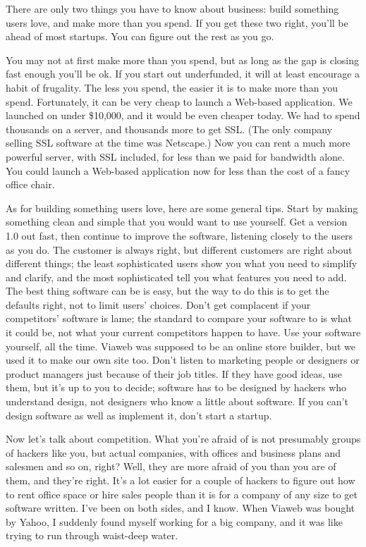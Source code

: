 There are only two things you have to know about business: build
something users love, and make more than you spend. If you get these two
right, you'll be ahead of most startups. You can figure out the rest as
you go.

You may not at first make more than you spend, but as long as the gap is
closing fast enough you'll be ok. If you start out underfunded, it will
at least encourage a habit of frugality. The less you spend, the easier
it is to make more than you spend. Fortunately, it can be very cheap to
launch a Web-based application. We launched on under \$10,000, and it
would be even cheaper today. We had to spend thousands on a server, and
thousands more to get SSL. (The only company selling SSL software at the
time was Netscape.) Now you can rent a much more powerful server, with
SSL included, for less than we paid for bandwidth alone. You could
launch a Web-based application now for less than the cost of a fancy
office chair.

As for building something users love, here are some general tips. Start
by making something clean and simple that you would want to use
yourself. Get a version 1.0 out fast, then continue to improve the
software, listening closely to the users as you do. The customer is
always right, but different customers are right about different things;
the least sophisticated users show you what you need to simplify and
clarify, and the most sophisticated tell you what features you need to
add. The best thing software can be is easy, but the way to do this is
to get the defaults right, not to limit users' choices. Don't get
complacent if your competitors' software is lame; the standard to
compare your software to is what it could be, not what your current
competitors happen to have. Use your software yourself, all the time.
Viaweb was supposed to be an online store builder, but we used it to
make our own site too. Don't listen to marketing people or designers or
product managers just because of their job titles. If they have good
ideas, use them, but it's up to you to decide; software has to be
designed by hackers who understand design, not designers who know a
little about software. If you can't design software as well as implement
it, don't start a startup.

Now let's talk about competition. What you're afraid of is not
presumably groups of hackers like you, but actual companies, with
offices and business plans and salesmen and so on, right? Well, they are
more afraid of you than you are of them, and they're right. It's a lot
easier for a couple of hackers to figure out how to rent office space or
hire sales people than it is for a company of any size to get software
written. I've been on both sides, and I know. When Viaweb was bought by
Yahoo, I suddenly found myself working for a big company, and it was
like trying to run through waist-deep water.

